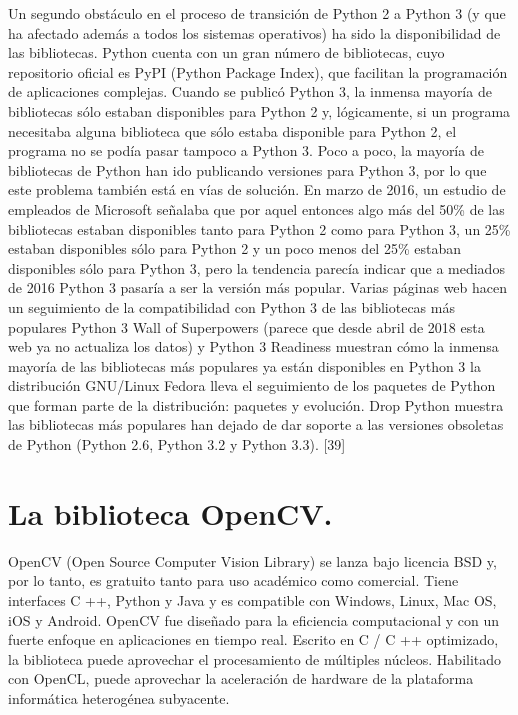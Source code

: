 \documentclass[12pt]{article}
\begin{document}
Un segundo obstáculo en el proceso de transición de Python 2 a Python 3 (y que ha afectado además a todos los sistemas operativos) ha sido la disponibilidad de las bibliotecas.
Python cuenta con un gran número de bibliotecas, cuyo repositorio oficial es PyPI (Python Package Index), que facilitan la programación de aplicaciones complejas. Cuando se publicó Python 3, la inmensa mayoría de bibliotecas sólo estaban disponibles para Python 2 y, lógicamente, si un programa necesitaba alguna biblioteca que sólo estaba disponible para Python 2, el programa no se podía pasar tampoco a Python 3.
Poco a poco, la mayoría de bibliotecas de Python han ido publicando versiones para Python 3, por lo que este problema también está en vías de solución.
En marzo de 2016, un estudio de empleados de Microsoft señalaba que por aquel entonces algo más del 50\% de las bibliotecas estaban disponibles tanto para Python 2 como para Python 3, un 25\% estaban disponibles sólo para Python 2 y un poco menos del 25\% estaban disponibles sólo para Python 3, pero la tendencia parecía indicar que a mediados de 2016 Python 3 pasaría a ser la versión más popular.
Varias páginas web hacen un seguimiento de la compatibilidad con Python 3 de las bibliotecas más populares
Python 3 Wall of Superpowers (parece que desde abril de 2018 esta web ya no actualiza los datos) y Python 3 Readiness muestran cómo la inmensa mayoría de las bibliotecas más populares ya están disponibles en Python 3
la distribución GNU/Linux Fedora lleva el seguimiento de los paquetes de Python que forman parte de la distribución: paquetes y evolución.
Drop Python muestra las bibliotecas más populares han dejado de dar soporte a las versiones obsoletas de Python (Python 2.6, Python 3.2 y Python 3.3). [39]


\section{La biblioteca OpenCV.}

OpenCV (Open Source Computer Vision Library) se lanza bajo licencia BSD y, por lo tanto, es gratuito tanto para uso académico como comercial. Tiene interfaces C ++, Python y Java y es compatible con Windows, Linux, Mac OS, iOS y Android. OpenCV fue diseñado para la eficiencia computacional y con un fuerte enfoque en aplicaciones en tiempo real. Escrito en C / C ++ optimizado, la biblioteca puede aprovechar el procesamiento de múltiples núcleos. Habilitado con OpenCL, puede aprovechar la aceleración de hardware de la plataforma informática heterogénea subyacente.
\end{document}
